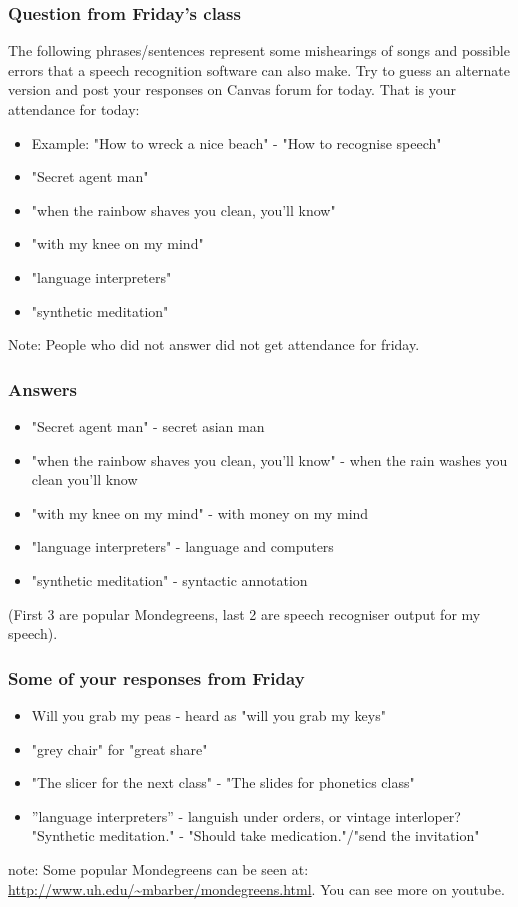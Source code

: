 \documentclass{beamer}
\begin{document}
\begin{frame}
\frametitle{Question from Friday's class}
The following phrases/sentences represent some mishearings of songs and possible errors that a speech recognition software can also make. Try to guess an alternate version and post your responses on Canvas forum for today. That is your attendance for today:
\begin{itemize}
\item Example: "How to wreck a nice beach" - "How to recognise speech"
\item "Secret agent man" %
\item "when the rainbow shaves you clean, you'll know" %
\item "with my knee on my mind" %
\item "language interpreters" %
\item "synthetic meditation" %
\end{itemize}
Note: People who did not answer did not get attendance for friday. 
\end{frame}

\begin{frame}
\frametitle{Answers}
\begin{itemize}
\item "Secret agent man" - secret asian man
\item "when the rainbow shaves you clean, you'll know" - when the rain washes you clean you'll know
\item "with my knee on my mind" - with money on my mind
\item "language interpreters" - language and computers
\item "synthetic meditation" - syntactic annotation 
\end{itemize}
(First 3 are popular Mondegreens, last 2 are speech recogniser output for my speech).
\end{frame}

\begin{frame}
\frametitle{Some of your responses from Friday}
\begin{itemize}
\item Will you grab my peas - heard as "will you grab my keys"
\item "grey chair" for "great share"
\item "The slicer for the next class" - "The slides for phonetics class"
\item ”language interpreters” - languish under orders, or vintage interloper?
"Synthetic meditation." - "Should take medication."/"send the invitation"
\end{itemize}
note: Some popular Mondegreens can be seen at: \url{http://www.uh.edu/~mbarber/mondegreens.html}. You can see more on youtube.
\end{frame}
\end{document}
